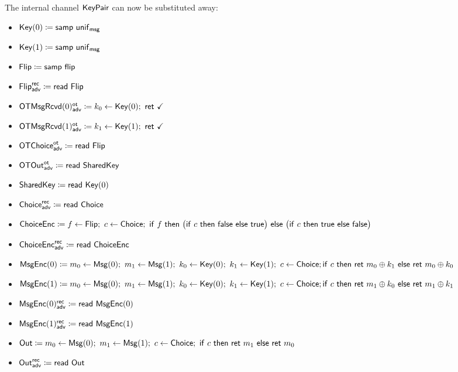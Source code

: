 \noindent The internal channel $\mathsf{KeyPair}$ can now be substituted away:

\begin{itemize}
\item $\mathsf{Key}(0) \coloneqq \mathsf{samp} \ \mathsf{unif}_{\mathsf{msg}}$
\item $\mathsf{Key}(1) \coloneqq \mathsf{samp} \ \mathsf{unif}_{\mathsf{msg}}$
\item $\mathsf{Flip} \coloneqq \mathsf{samp} \ \mathsf{flip}$
\item {\color{blue} $\mathsf{Flip}^{\mathsf{rec}}_{\mathsf{adv}} \coloneqq \mathsf{read} \ \mathsf{Flip}$}
\item {\color{blue} $\LeakOTMsgRcvd(0)^\ot_\adv \coloneqq k_0 \leftarrow \Key(0); \ \ret{\checkmark}$}
\item {\color{blue} $\LeakOTMsgRcvd(1)^\ot_\adv \coloneqq k_1 \leftarrow \Key(1); \ \ret{\checkmark}$}
\item {\color{blue} $\mathsf{OTChoice}^{\mathsf{ot}}_{\mathsf{adv}} \coloneqq \mathsf{read} \ \mathsf{Flip}$}
\item {\color{blue} $\mathsf{OTOut}^{\mathsf{ot}}_{\mathsf{adv}} \coloneqq \mathsf{read} \ \mathsf{SharedKey}$}
\item {\color{red} $\mathsf{SharedKey} \coloneqq \mathsf{read} \ \mathsf{Key}(0)$}
\item {\color{blue} $\mathsf{Choice}^{\mathsf{rec}}_{\mathsf{adv}} \coloneqq \mathsf{read} \ \mathsf{Choice}$}
\item $\ChoiceEnc \coloneqq f \leftarrow \Flip; \ c \leftarrow \Choice; \ \ifte{f}{\big(\ifte{c}{\false}{\true}\big)}{\big(\ifte{c}{\true}{\false}\big)}$
\item {\color{blue} $\mathsf{ChoiceEnc}^{\mathsf{rec}}_{\mathsf{adv}} \coloneqq \mathsf{read} \ \mathsf{ChoiceEnc}$}
\item {\color{red} $\mathsf{MsgEnc}(0) \coloneqq m_0 \leftarrow \mathsf{Msg}(0); \ m_1 \leftarrow \mathsf{Msg}(1); \ k_0 \leftarrow \mathsf{Key}(0); \ k_1 \leftarrow \mathsf{Key}(1); \ c \leftarrow \mathsf{Choice}; \\ \mathsf{if} \ c \ \mathsf{then} \ \mathsf{ret} \ m_0 \oplus k_1 \ \mathsf{else} \ \mathsf{ret} \ m_0 \oplus k_0$}
\item {\color{red} $\mathsf{MsgEnc}(1) \coloneqq m_0 \leftarrow \mathsf{Msg}(0); \ m_1 \leftarrow \mathsf{Msg}(1); \ k_0 \leftarrow \mathsf{Key}(0); \ k_1 \leftarrow \mathsf{Key}(1); \ c \leftarrow \mathsf{Choice}; \\ \mathsf{if} \ c \ \mathsf{then} \ \mathsf{ret} \ m_1 \oplus k_0 \ \mathsf{else} \ \mathsf{ret} \ m_1 \oplus k_1$}
\item {\color{blue} $\mathsf{MsgEnc}(0)^{\mathsf{rec}}_{\mathsf{adv}} \coloneqq \mathsf{read} \ \mathsf{MsgEnc}(0)$}
\item {\color{blue} $\mathsf{MsgEnc}(1)^{\mathsf{rec}}_{\mathsf{adv}} \coloneqq \mathsf{read} \ \mathsf{MsgEnc}(1)$}
\item $\Out \coloneqq m_0 \leftarrow \Msg(0); \ m_1 \leftarrow \Msg(1); \ c \leftarrow \Choice; \ \ifte{c}{\ret{m_1}}{\ret{m_0}}$
\item {\color{blue} $\mathsf{Out}^{\mathsf{rec}}_{\mathsf{adv}} \coloneqq \mathsf{read} \ \mathsf{Out}$}
\end{itemize}

